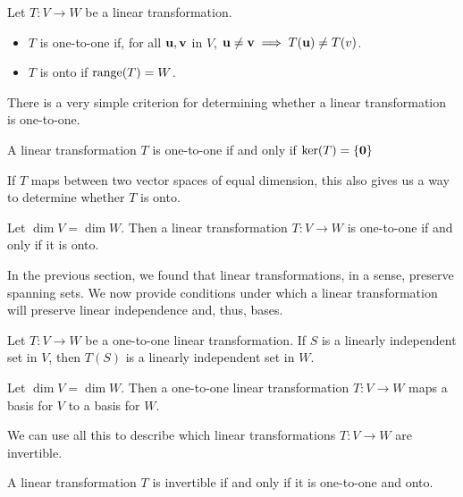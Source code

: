 \documentclass[../m73main.tex]{subfiles}
\begin{document}
\begin{definition}
	Let $T : V \to W$ be a linear transformation.
	\begin{itemize}
		\item $T$ is one-to-one if, for all $\mathbf{u}, \mathbf{v}$ in $V$, $\mathbf{u} \neq \mathbf{v} \implies T(\mathbf{u}) \neq T(v)$.
		\item $T$ is onto if $\textrm{range}(T) = W$.
	\end{itemize}
\end{definition}

There is a very simple criterion for determining whether a linear transformation is one-to-one.

\begin{theorem}
	A linear transformation $T$ is one-to-one if and only if $\textrm{ker}(T) = \{\mathbf{0}\}$
\end{theorem}

If $T$ maps between two vector spaces of equal dimension, this also gives us a way to determine whether $T$ is onto.

\begin{theorem}
	Let $\dim V = \dim W$.
	Then a linear transformation $T : V \to W$ is one-to-one if and only if it is onto.
\end{theorem}

In the previous section, we found that linear transformations, in a sense, preserve spanning sets.
We now provide conditions under which a linear transformation will preserve linear independence and, thus, bases.

\begin{theorem}
	Let $T : V \to W$ be a one-to-one linear transformation.
	If $S$ is a linearly independent set in $V$, then $T(S)$ is a linearly independent set in $W$.
\end{theorem}

\begin{corollary}
	Let $\dim V = \dim W$.
	Then a one-to-one linear transformation $T : V \to W$ maps a basis for $V$ to a basis for $W$.
\end{corollary}

We can use all this to describe which linear transformations $T : V \to W$ are invertible.

\begin{theorem}
	A linear transformation $T$ is invertible if and only if it is one-to-one and onto.
\end{theorem}
\end{document}
